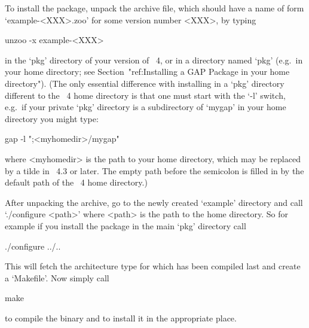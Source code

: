 


To install the {\Example} package, unpack the archive file, which  should
have a name of form `example-<XXX>.zoo' for some version number <XXX>, by
typing

unzoo -x example-<XXX>

in the `pkg' directory of your version of {\GAP}~4,  or  in  a  directory
named `pkg' (e.g.~in your home directory; see  Section~"ref:Installing  a
GAP Package in your home directory"). (The only essential difference with
installing {\Example} in a `pkg' directory different to the {\GAP}~4 home
directory is that one must start {\GAP} with  the  `-l'  switch,  e.g.~if
your private `pkg' directory is a subdirectory of `mygap'  in  your  home
directory you might type:

gap -l ";<myhomedir>/mygap"

where <myhomedir> is the path  to  your  home  directory,  which  may  be
replaced by a tilde in {\GAP}~4.3 or later. The  empty  path  before  the
semicolon is  filled  in  by  the  default  path  of  the  {\GAP}~4  home
directory.)

After unpacking the archive, go to the newly created `example'  directory
and call `./configure <path>' where <path> is the path to the {\GAP} home
directory. So for example if you install the package in  the  main  `pkg'
directory call

\begintt
./configure ../..
\endtt

This will fetch the architecture type for which {\GAP} has been  compiled
last and create a `Makefile'. Now simply call

\begintt
make
\endtt

to compile the binary and to install it in the appropriate place.


